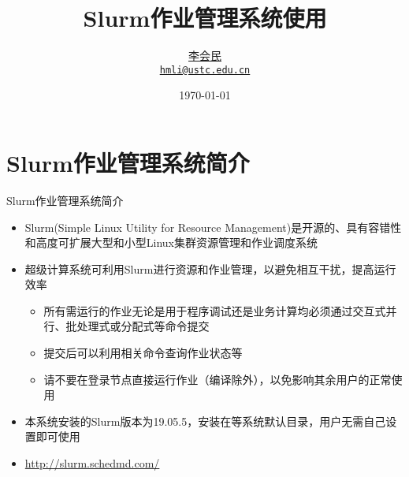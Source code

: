 
 

\title{Slurm作业管理系统使用}
\date{\today}
\author[李会民]{\href{http://hmli.ustc.edu.cn}{李会民}\\ \texttt{\href{mailto:hmli@ustc.edu.cn}{hmli@ustc.edu.cn}}}
\subject{Slurm作业管理系统使用}
 
\frame{\titlepage}
\section{Slurm作业管理系统简介}
\begin{frame}{Slurm作业管理系统简介}
\begin{itemize}
	\item Slurm(Simple Linux Utility for Resource Management)是开源的、具有容错性和高度可扩展大型和小型Linux集群资源管理和作业调度系统
	\item 超级计算系统可利用Slurm进行资源和作业管理，以避免相互干扰，提高运行效率
	\begin{itemize}
		\item 所有需运行的作业无论是用于程序调试还是业务计算均必须通过交互式并行、批处理式或分配式等命令提交
		\item 提交后可以利用相关命令查询作业状态等
		\item 请不要在登录节点直接运行作业（编译除外），以免影响其余用户的正常使用
	\end{itemize}
\item 本系统安装的Slurm版本为19.05.5，安装在等系统默认目录，用户无需自己设置即可使用
\item \url{http://slurm.schedmd.com/}
\end{itemize}
\end{frame}

